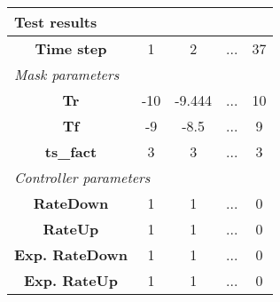 \vspace{1em}
\begin{tabularx}{\textwidth}{|c|c|c|>{\centering\arraybackslash}X|c|}
\hline
\multicolumn{5}{|l|}{\cellcolor[gray]{0.8}\textbf{Test results}} \tabularnewline \hline
\textbf{Time step} & 1 & 2 & ... & 37 \tabularnewline \hline
\multicolumn{5}{|l|}{\cellcolor[gray]{0.9}\textit{Mask parameters}} \tabularnewline \hline
\textbf{Tr} & -10 & -9.444 & ... & 10 \tabularnewline \hline
\textbf{Tf} & -9 & -8.5 & ... & 9 \tabularnewline \hline
\textbf{ts\_fact} & 3 & 3 & ... & 3 \tabularnewline \hline
\multicolumn{5}{|l|}{\cellcolor[gray]{0.9}\textit{Controller parameters}} \tabularnewline \hline
\textbf{RateDown} & 1 & 1 & ... & 0 \tabularnewline \hline
\textbf{RateUp} & 1 & 1 & ... & 0 \tabularnewline \hline
\textbf{Exp. RateDown} & 1 & 1 & ... & 0 \tabularnewline \hline
\textbf{Exp. RateUp} & 1 & 1 & ... & 0 \tabularnewline \hline
\end{tabularx}
\vspace{1ex}
